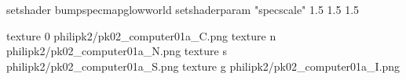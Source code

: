 setshader bumpspecmapglowworld
setshaderparam "specscale" 1.5 1.5 1.5


texture 0 philipk2/pk02_computer01a_C.png
texture n philipk2/pk02_computer01a_N.png
texture s philipk2/pk02_computer01a_S.png
texture g philipk2/pk02_computer01a_I.png

